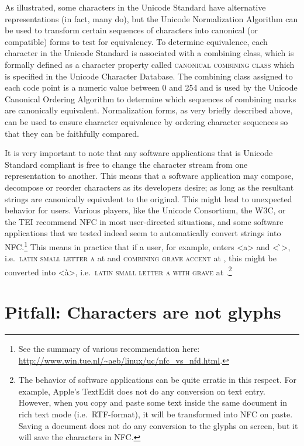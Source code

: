 As illustrated, some characters in the Unicode Standard have alternative
representations (in fact, many do), but the Unicode Normalization Algorithm can
be used to transform certain sequences of characters into canonical (or
compatible) forms to test for equivalency. To determine equivalence, each
character in the Unicode Standard is associated with a combining class, which is
formally defined as a character property called \textsc{canonical combining
class} which is specified in the Unicode Character Database. The combining class
assigned to each code point is a numeric value between 0 and 254 and is used by
the Unicode Canonical Ordering Algorithm to determine which sequences of
combining marks are canonically equivalent. Normalization forms, as very briefly
described above, can be used to ensure character equivalence by ordering
character sequences so that they can be faithfully compared.

It is very important to note that any software applications that is Unicode
Standard compliant is free to change the character stream from one
representation to another. This means that a software application may compose,
decompose or reorder characters as its developers desire; as long as the
resultant strings are canonically equivalent to the original. This might lead to
unexpected behavior for users. Various players, like the Unicode Consortium, the
W{\large 3}C, or the TEI recommend NFC in most user-directed situations, and some
software applications that we tested indeed seem to automatically convert
strings into NFC.\footnote{See the summary of various recommendation here:
\url{http://www.win.tue.nl/~aeb/linux/uc/nfc_vs_nfd.html}.}
This means in practice that if a user, for example, enters <a> and < ̀>,
i.e.~\textsc{latin small letter a} at  and \textsc{combining grave
accent} at , this might be converted into <à>, i.e.~\textsc{latin
small letter a with grave} at .\footnote{The behavior of software
applications can be quite erratic in this respect. For example, Apple's TextEdit
does not do any conversion on text entry. However, when you copy and paste some
text inside the same document in rich text mode (i.e.~RTF-format), it
will be transformed into NFC on paste. Saving a document does not do any
conversion to the glyphs on screen, but it will save the characters in NFC.}

\section{Pitfall: Characters are not glyphs}
\label{pitfall-characters-are-not-glyphs}

